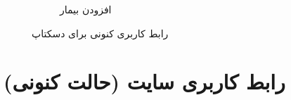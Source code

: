 \documentclass[a4paper,12pt]{report}
\begin{document}
\begin{figure}[!h]
		\begin{subfigure}[t]{0.6\linewidth}
			\caption{
				افزودن بیمار}
		\end{subfigure}
		\normalsize
		\label{fig1:sec2:chap3}
		\caption{
			رابط کاربری کنونی برای دسکتاپ
		}
	\end{figure}
	
	\pagebreak
	\section{
		رابط کاربری سایت (حالت کنونی)
	}\label{sec3:chap3}
	
\end{document}
